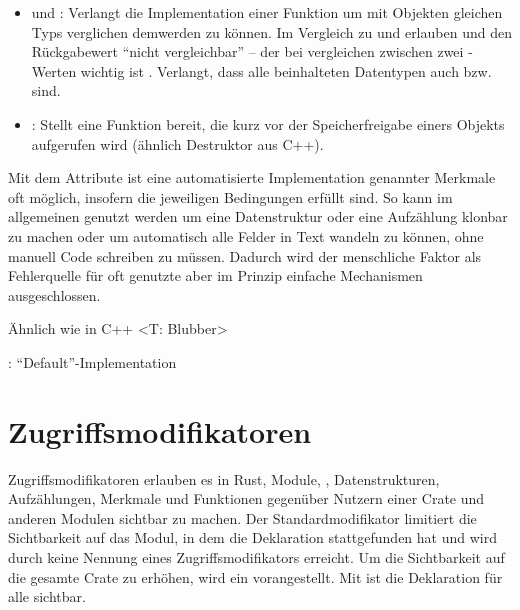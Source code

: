 \begin{itemize}
	\item {} und : Verlangt die Implementation einer Funktion um mit Objekten gleichen Typs verglichen demwerden zu können. Im Vergleich zu  und  erlauben  und  den Rückgabewert \enquote{nicht vergleichbar} -- der bei  vergleichen zwischen zwei -Werten wichtig ist . Verlangt, dass alle beinhalteten Datentypen auch  bzw.  sind.
	\item {}: Stellt eine Funktion bereit, die kurz vor der Speicherfreigabe einers Objekts aufgerufen wird (ähnlich Destruktor aus C++).
\end{itemize}

Mit dem Attribute \rustcinline{#[derive(..)]} ist eine automatisierte Implementation genannter Merkmale oft möglich, insofern die jeweiligen Bedingungen erfüllt sind.
So kann im allgemeinen  genutzt werden um eine Datenstruktur oder eine Aufzählung klonbar zu machen oder  um automatisch alle Felder in Text wandeln zu können, ohne manuell Code schreiben zu müssen.
Dadurch wird der menschliche Faktor als Fehlerquelle für oft genutzte aber im Prinzip einfache Mechanismen ausgeschlossen.

Ähnlich wie in C++ <T: Blubber>


: \enquote{Default}-Implementation



\section{Zugriffsmodifikatoren}
\label{rust:access_modifier}

Zugriffsmodifikatoren erlauben es in Rust, Module, , Datenstrukturen, Aufzählungen, Merkmale und Funktionen gegenüber Nutzern einer Crate und anderen Modulen sichtbar zu machen.
Der Standardmodifikator limitiert die Sichtbarkeit auf das Modul, in dem die Deklaration stattgefunden hat und wird durch keine Nennung eines Zugriffsmodifikators erreicht.
Um die Sichtbarkeit auf die gesamte Crate zu erhöhen, wird ein  vorangestellt.
Mit  ist die Deklaration für alle sichtbar.



